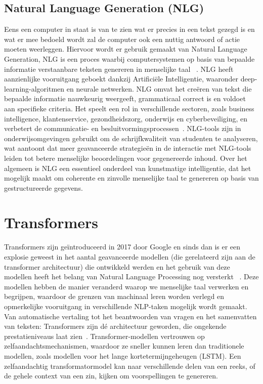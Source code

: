 \subsection{Natural Language Generation (NLG)}
Eens een computer in staat is van te zien wat er precies in een tekst gezegd is en wat er mee bedoeld wordt zal de computer ook een nuttig antwoord of actie moeten weerleggen. Hiervoor wordt er gebruik gemaakt van Natural Language Generation, NLG is een proces waarbij computersystemen op basis van bepaalde informatie verstaanbare teksten genereren in menselijke taal ~\autocite{Yang2022}. NLG heeft aanzienlijke vooruitgang geboekt dankzij Artificiële Intelligentie, waaronder deep-learning-algoritmen en neurale netwerken. NLG omvat het creëren van tekst die bepaalde informatie nauwkeurig weergeeft, grammaticaal correct is en voldoet aan specifieke criteria. Het speelt een rol in verschillende sectoren, zoals business intelligence, klantenservice, gezondheidszorg, onderwijs en cyberbeveiliging, en verbetert de communicatie- en besluitvormingsprocessen~\autocite{Woo}. NLG-tools zijn in onderwijsomgevingen gebruikt om de schrijfkwaliteit van studenten te analyseren, wat aantoont dat meer geavanceerde strategieën in de interactie met NLG-tools leiden tot betere menselijke beoordelingen voor gegenereerde inhoud. Over het algemeen is NLG een essentieel onderdeel van kunstmatige intelligentie, dat het mogelijk maakt om coherente en zinvolle menselijke taal te genereren op basis van gestructureerde gegevens.

\section{Transformers}
Transformers zijn geïntroduceerd in 2017 door Google en sinds dan is er een explosie geweest in het aantal geavanceerde modellen (die gerelateerd zijn aan de transformer architectuur) die ontwikkeld werden en het gebruik van deze modellen heeft het belang van Natural Language Processing nog versterkt ~\autocite{Suresh2022}.  Deze modellen hebben de manier veranderd waarop we menselijke taal verwerken en begrijpen, waardoor de grenzen van machinaal leren worden verlegd en opmerkelijke vooruitgang in verschillende NLP-taken mogelijk wordt gemaakt. Van automatische vertaling tot het beantwoorden van vragen en het samenvatten van teksten: Transformers zijn dé architectuur geworden, die ongekende prestatieniveaus laat zien~\autocite{Nemeon}. 
Transformer-modellen vertrouwen op zelfaandachtsmechanismen, waardoor ze sneller kunnen leren dan traditionele modellen, zoals modellen voor het lange kortetermijngeheugen (LSTM). Een zelfaandachtig transformatormodel kan naar verschillende delen van een reeks, of de gehele context van een zin, kijken om voorspellingen te genereren.

